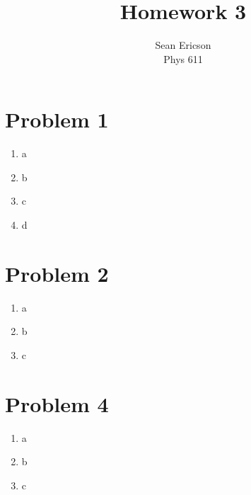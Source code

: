 \documentclass[12pt]{article}
\begin{document}
\title{Homework 3}
\author{Sean Ericson \\ Phys 611}
\maketitle

\section*{Problem 1}
\begin{enumerate}[label=(\alph*)]
    \item a
    \item b
    \item c
    \item d
\end{enumerate}


\section*{Problem 2}
\begin{enumerate}[label=(\alph*)]
    \item a
    \item b
    \item c
\end{enumerate}



\section*{Problem 4}
\begin{enumerate}[label=(\alph*)]
    \item a
    \item b
    \item c
\end{enumerate}
\end{document}
